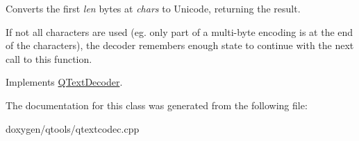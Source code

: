 Converts the first {\itshape len} bytes at {\itshape chars} to Unicode, returning the result.

If not all characters are used (eg. only part of a multi-\/byte encoding is at the end of the characters), the decoder remembers enough state to continue with the next call to this function. 

Implements \mbox{\hyperlink{class_q_text_decoder_aec543f7f6670dfda14164268e2da879d}{Q\+Text\+Decoder}}.



The documentation for this class was generated from the following file\+:\begin{DoxyCompactItemize}
\item 
doxygen/qtools/qtextcodec.\+cpp\end{DoxyCompactItemize}
